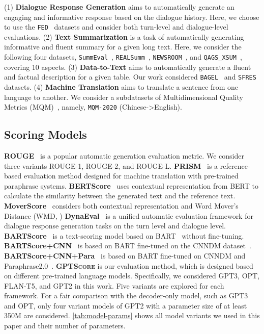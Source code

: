 (1) \textbf{Dialogue Response Generation} aims to automatically generate an engaging and informative response based on the dialogue history. Here, we choose to use the \texttt{FED}~\cite{fed2020shikib} datasets and consider both turn-level and dialogue-level evaluations. (2) \textbf{Text Summarization} is a task of automatically generating informative and fluent summary for a given long text. Here, we consider the following four datasets, \texttt{SummEval}~\cite{realsumm2020manik}, 
\texttt{REALSumm}~\cite{realsumm2020manik}, \texttt{NEWSROOM}~\cite{newsroom2018max}, and \texttt{QAGS\_XSUM}~\cite{qags20alex}, covering 10 aspects. (3) \textbf{Data-to-Text} aims to automatically generate a fluent and factual description for a given table. Our work considered \texttt{BAGEL}~\cite{bagel2010francois} and \texttt{SFRES}~\cite{sfres2015tsung} datasets. (4) \textbf{Machine Translation} aims to translate a sentence from one language to another. We consider a subdatasets of Multidimensional Quality Metrics (MQM)~\cite{freitag:mqm}, namely, \texttt{MQM-2020} (Chinese->English). 

\subsection{Scoring Models}
     \textbf{ROUGE}~\cite{rouge2004lin} is a popular automatic generation evaluation metric. We consider three variants ROUGE-1, ROUGE-2, and ROUGE-L.
     \textbf{PRISM}~\cite{prism:brian} is a reference-based evaluation method designed for machine translation with pre-trained paraphrase systems.
     \textbf{BERTScore}~\cite{bertscore2020tianyi} uses contextual representation from BERT to calculate the similarity between the generated text and the reference text. 
     \textbf{MoverScore}~\cite{moverscore2019wei} considers both contextual representation and Word Mover's Distance (WMD, \cite{wmd:kusner})
     \textbf{DynaEval}~\cite{zhang:dynaeval} is a unified automatic evaluation framework for dialogue response generation tasks on the turn level and dialogue level.
    \textbf{BARTScore}~\cite{bartscore2021yuan} is a text-scoring model based on BART~\cite{bart:mike} without fine-tuning.    
     \textbf{BARTScore+CNN}~\cite{bartscore2021yuan} is based on BART fine-tuned on the CNNDM dataset~\cite{cnndm:karl}. 
    \textbf{BARTScore+CNN+Para}~\cite{bartscore2021yuan} is based on BART fine-tuned on CNNDM and Paraphrase2.0~\cite{paraphrase:edward}. 
     \textbf{\textsc{GPTScore}} is our evaluation method, which is designed based on different pre-trained language models. Specifically, we considered GPT3, OPT, FLAN-T5, and GPT2 in this work. Five variants are explored for each framework. For a fair comparison with the decoder-only model, such as GPT3 and OPT, only four variant models of GPT2 with a parameter size of at least 350M are considered. \autoref{tab:model-params} shows all model variants we used in this paper and their number of parameters.

